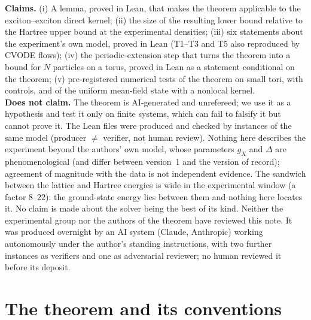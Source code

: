 \documentclass[11pt,a4paper]{article}
\begin{document}
\begin{keybox}[title={What this note claims and what it does not}]
\textbf{Claims.} (i) A lemma, proved in Lean, that makes the theorem applicable to the exciton--exciton direct kernel; (ii) the size of the
resulting lower bound relative to the Hartree upper bound at the experimental densities; (iii) six statements about the experiment's own
model, proved in Lean (T1--T3 and T5 also reproduced by CVODE flows); (iv) the periodic-extension step that turns the theorem into a bound for $N$ particles
on a torus, proved in Lean as a statement conditional on the theorem; (v) pre-registered numerical tests of the theorem on small tori, with
controls, and of the uniform mean-field state with a nonlocal kernel.\\
\textbf{Does not claim.} The theorem is AI-generated and unrefereed; we use it as a hypothesis and test it only on finite systems, which
can fail to falsify it but cannot prove it. The Lean files were produced and checked by instances of the same model (producer
$\neq$ verifier, not human review). Nothing here describes the experiment beyond the authors' own model, whose parameters
$g_X$ and $\Delta$ are phenomenological (and differ between version~1 and the version of record); agreement of magnitude with the data is
not independent evidence. The sandwich between the lattice and Hartree energies is wide in the experimental window (a factor $8$--$22$):
the ground-state energy lies between them and nothing here locates it. No claim is made about the solver being the best of its kind. Neither the experimental group nor the authors of the
theorem have reviewed this note. It was produced overnight by an AI system (Claude, Anthropic) working autonomously under the
author's standing instructions, with two further instances as verifiers and one as adversarial reviewer; no human reviewed it
before its deposit.
\end{keybox}

\section{The theorem and its conventions}\label{sec:theorem}
\end{document}
